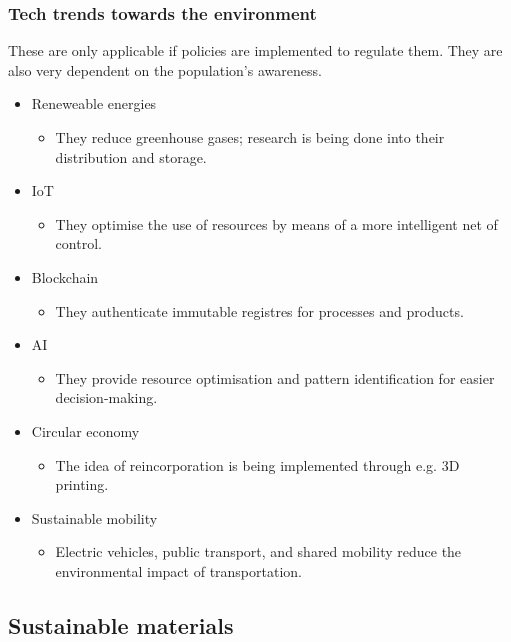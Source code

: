 \documentclass[12pt]{article}
\begin{document}
\subsubsection*{Tech trends towards the environment}

These are only applicable if policies are implemented to regulate them. They are
also very dependent on the population's awareness.

\begin{itemize}
    \item Reneweable energies
    \begin{itemize}
        \item They reduce greenhouse gases; research is being done into their
        distribution and storage.
    \end{itemize}
    \item IoT
    \begin{itemize}
        \item They optimise the use of resources by means of a more intelligent
        net of control.
    \end{itemize}
    \item Blockchain
    \begin{itemize}
        \item They authenticate immutable registres for processes and products.
    \end{itemize}
    \item AI
    \begin{itemize}
        \item They provide resource optimisation and pattern identification for
        easier decision-making.
    \end{itemize}
    \item Circular economy
    \begin{itemize}
        \item The idea of reincorporation is being implemented through e.g. 3D
        printing.
    \end{itemize}
    \item Sustainable mobility
    \begin{itemize}
        \item Electric vehicles, public transport, and shared mobility reduce
        the environmental impact of transportation.
    \end{itemize}
\end{itemize}

\subsection*{Sustainable materials}
\end{document}
